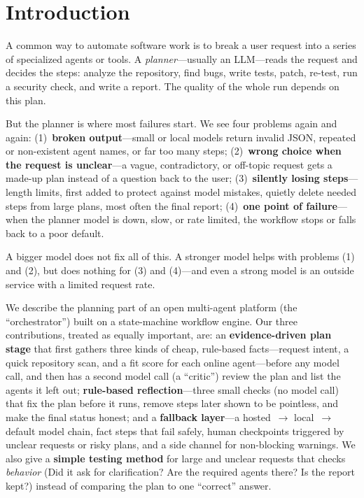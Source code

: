 \documentclass[conference]{IEEEtran}
\begin{document}
\section{Introduction}
A common way to automate software work is to break a user request into a series of
specialized agents or tools. A \emph{planner}---usually an LLM---reads the request
and decides the steps: analyze the repository, find bugs, write tests, patch,
re-test, run a security check, and write a report. The quality of the whole run
depends on this plan.

But the planner is where most failures start. We see four problems again and
again: (1)~\textbf{broken output}---small or local models return invalid JSON,
repeated or non-existent agent names, or far too many steps;
(2)~\textbf{wrong choice when the request is unclear}---a vague, contradictory, or
off-topic request gets a made-up plan instead of a question back to the user;
(3)~\textbf{silently losing steps}---length limits, first added to protect against
model mistakes, quietly delete needed steps from large plans, most often the final
report; (4)~\textbf{one point of failure}---when the planner model is down, slow,
or rate limited, the workflow stops or falls back to a poor default.

A bigger model does not fix all of this. A stronger model helps with problems (1)
and (2), but does nothing for (3) and (4)---and even a strong model is an outside
service with a limited request rate.

We describe the planning part of an open multi-agent platform (the
``orchestrator'') built on a state-machine workflow engine. Our three
contributions, treated as equally important, are: an \textbf{evidence-driven plan
stage} that first gathers three kinds of cheap, rule-based facts---request intent,
a quick repository scan, and a fit score for each online agent---before any model
call, and then has a second model call (a ``critic'') review the plan and list the
agents it left out; \textbf{rule-based reflection}---three small checks (no model
call) that fix the plan before it runs, remove steps later shown to be pointless,
and make the final status honest; and a \textbf{fallback layer}---a
hosted~$\rightarrow$ local~$\rightarrow$ default model chain, fact steps that fail
safely, human checkpoints triggered by unclear requests or risky plans, and a side
channel for non-blocking warnings. We also give a \textbf{simple testing method}
for large and unclear requests that checks \emph{behavior} (Did
it ask for clarification? Are the required agents there? Is the report kept?)
instead of comparing the plan to one ``correct'' answer.
\end{document}
